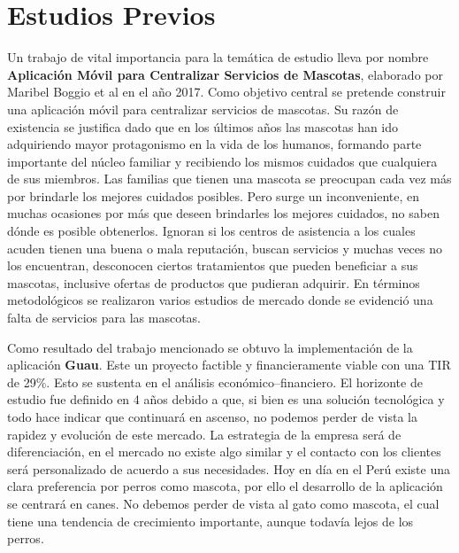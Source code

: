 \section{Estudios Previos}
Un trabajo de vital importancia para la temática de estudio lleva por nombre \textbf{Aplicación Móvil para Centralizar Servicios de Mascotas}, elaborado por Maribel Boggio et al en el año 2017. Como objetivo central se pretende construir una aplicación móvil para centralizar servicios de mascotas. Su razón de existencia se justifica dado que en los últimos años las mascotas han ido adquiriendo mayor protagonismo en la vida de los humanos, formando parte importante del núcleo familiar y recibiendo los mismos cuidados que cualquiera de sus miembros. Las familias que tienen una mascota se preocupan cada vez más por brindarle los mejores cuidados posibles. Pero surge un inconveniente, en muchas ocasiones por más que deseen brindarles los mejores cuidados, no saben dónde es posible obtenerlos. Ignoran si los centros de asistencia a los cuales acuden tienen una buena o mala reputación, buscan servicios y muchas veces no los encuentran, desconocen ciertos tratamientos que pueden beneficiar a sus mascotas, inclusive ofertas de productos que pudieran adquirir. En términos metodológicos se realizaron varios estudios de mercado donde se evidenció una falta de servicios para las mascotas. 

Como resultado del trabajo mencionado se obtuvo la implementación de la aplicación \textbf{Guau}.
Este un proyecto factible y financieramente viable con una TIR de 29\%. Esto se sustenta en el análisis económico–financiero. El horizonte de estudio fue definido en 4 años debido a que, si bien es una solución tecnológica y todo hace indicar que continuará en ascenso, no podemos perder de vista la rapidez y evolución de este mercado. La estrategia de la empresa será de diferenciación, en el mercado no existe algo similar y el contacto con los clientes será personalizado de acuerdo a sus necesidades. Hoy en día en el Perú existe una clara preferencia por perros como mascota, por ello el desarrollo de la aplicación se centrará en canes. No debemos perder de vista al gato como mascota, el cual tiene una tendencia de crecimiento importante, aunque todavía lejos de los perros.

